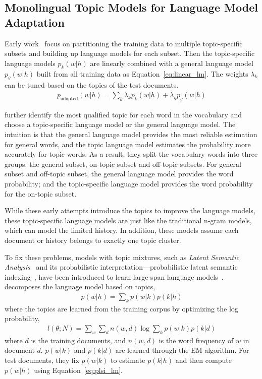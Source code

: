 
\subsection{Monolingual Topic Models for Language Model Adaptation}

Early work~\citet{Clarkson-1997,Seymore-1997,Kneser-1997,Iyer-1999} focus on
partitioning the training data to multiple topic-specific subsets and
building up language models for each subset. Then the topic-specific
language models $p_k(w|h)$ are linearly combined with a general
language model $p_g(w|h)$ built from all training data as
Equation~\ref{eq:linear_lm}. The weights $\lambda_k$ can be tuned
based on the topics of the test documents.
\begin{align}
\label{eq:linear_lm}
p_\textrm{adapted}(w|h) = \sum_k \lambda_k p_k(w|h) + \lambda_g p_g(w|h)
\end{align}

\citet{Seymore-1998} further identify the most qualified topic for
each word in the vocabulary and choose a topic-specific language model
or the general language model. The intuition is that the general
language model provides the most reliable estimation for general
words, and the topic language model estimates the probability more
accurately for topic words. As a result, they split the vocabulary
words into three groups: the general subset, on-topic subset and
off-topic subsets. For general subset and off-topic subset, the
general language model provides the word probability; and the
topic-specific language model provides the word probability for the
on-topic subset.

While these early attempts introduce the topics to improve the
language models, these topic-specific language models are just like
the traditional n-gram models, which can model the limited
history. In addition, these models assume each document or history belongs
to exactly one topic cluster.

To fix these problems, models with topic mixtures, such as
\emph{Latent Semantic Analysis}~\citep[\textsc{lsa}]{deerwester-90}
and its probabilistic interpretation---probabilistic latent semantic
indexing~\citep[\textsc{plsi}]{hofmann-99}, have been introduced to
learn large-span language
models~\citep{Bellegarda-1997,Coccaro-1998,Gildea-1999}. \citet{Gildea-1999}
decomposes the language model based on topics,
\begin{align}
\label{eq:plsi_lm}
p(w|h) = \sum_k p(w|k) p(k|h)
\end{align}
where the topics are learned from the training corpus by optimizing the log probability,
\begin{align}
l(\theta; N) = \sum_w \sum_d n(w,d) \log \sum_k p(w|k) p(k|d)
\end{align}
where $d$ is the training documents, and $n(w,d)$ is the word frequency of $w$ in document $d$. $p(w|k)$ and $p(k|d)$ are learned through the EM algorithm. For test documents, they fix $p(w|k)$ to estimate $p(k|h)$ and then compute $p(w|h)$ using Equation~\ref{eq:plsi_lm}. 

